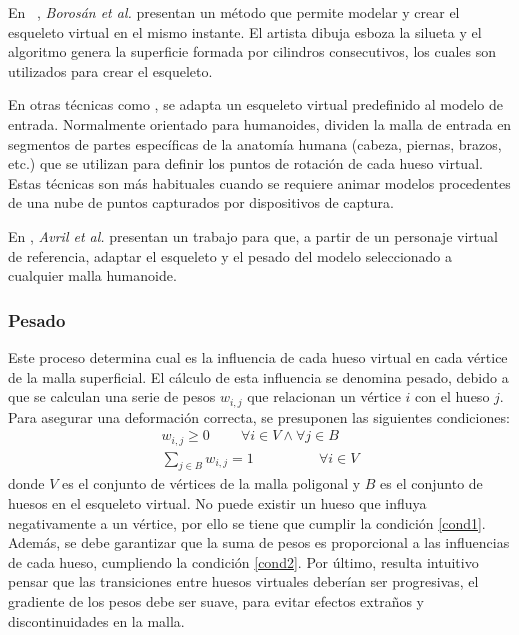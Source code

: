 En ~\cite{borosan2012rigmesh}, \emph{Borosán et al.} presentan un método que permite modelar y crear el esqueleto virtual en el mismo instante. El artista dibuja esboza la silueta y el algoritmo genera la superficie formada por cilindros consecutivos, los cuales son utilizados para crear el esqueleto.


En otras técnicas como \cite{huang2013robust}, se adapta un esqueleto virtual predefinido al modelo de entrada. Normalmente orientado para humanoides, dividen la malla de entrada en segmentos de partes específicas de la anatomía humana (cabeza, piernas, brazos, etc.) que se utilizan para definir los puntos de rotación de cada hueso virtual. Estas técnicas son más habituales cuando se requiere animar modelos procedentes de una nube de puntos capturados por dispositivos de captura.

En \cite{avril2016animation}, \emph{Avril et al.} presentan un trabajo para que, a partir de un personaje virtual de referencia, adaptar el esqueleto y el pesado del modelo seleccionado a cualquier malla humanoide.


\subsubsection{Pesado}
\label{art:pesado}

Este proceso determina cual es la influencia de cada hueso virtual en cada vértice de la malla superficial.
El cálculo de esta influencia se denomina pesado, debido a que se calculan una serie de pesos $w_{i,j}$ que relacionan un vértice $i$ con el hueso $j$.
Para asegurar una deformación correcta, se presuponen las siguientes condiciones:
\begin{eqnarray}
\label{cond1}
w_{i,j}\geq 0 \;\;\;\;\;\;\;\; \forall i \in V \wedge \forall j \in B   \\
\label{cond2}
\sum_{j \in B} w_{i,j} = 1\ \;\;\;\;\;\;\;\;\;\;\;\;\;\;\;\;
\forall i \in V
\end{eqnarray}
donde $V$ es el conjunto de vértices de la malla poligonal y $B$ es el conjunto de huesos en el esqueleto virtual. No puede existir un hueso que influya negativamente a un vértice, por ello se tiene que cumplir la condición \ref{cond1}. %
Además, se debe garantizar que la suma de pesos es proporcional a las influencias de cada hueso, cumpliendo la condición \ref{cond2}.
Por último, resulta intuitivo pensar que las transiciones entre huesos virtuales deberían ser progresivas, el gradiente de los pesos debe ser suave, para evitar efectos extraños y discontinuidades en la malla.

